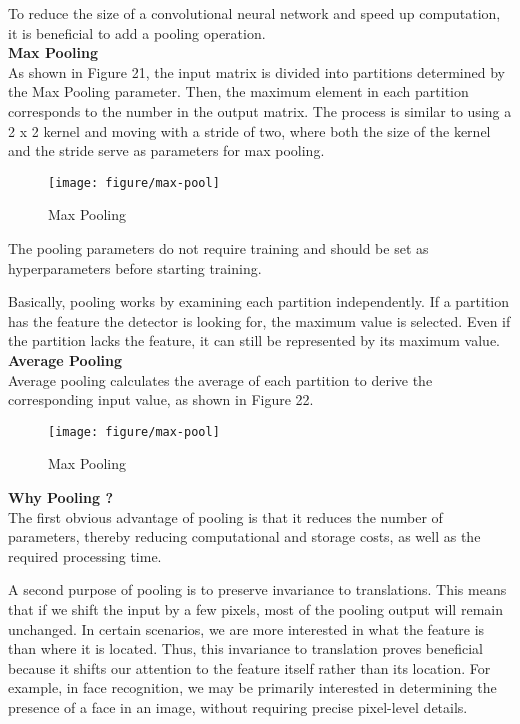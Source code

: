 \documentclass{article}
\begin{document}
To reduce the size of a convolutional neural network and speed up computation, it is beneficial to add a pooling operation.\\

\noindent
\textbf{Max Pooling}\\
\noindent
As shown in Figure 21, the input matrix is divided into partitions determined by the Max Pooling parameter. Then, the maximum element in each partition corresponds to the number in the output matrix. The process is similar to using a 2 x 2 kernel and moving with a stride of two, where both the size of the kernel and the stride serve as parameters for max pooling.


\begin{figure}[htbp]
        \centering
        \texttt{[image: figure/max-pool]}
        \caption{Max Pooling}
     \end{figure}
     
The pooling parameters do not require training and should be set as hyperparameters before starting training.

Basically, pooling works by examining each partition independently. If a partition has the feature the detector is looking for, the maximum value is selected. Even if the partition lacks the feature, it can still be represented by its maximum value.\\


\noindent
\textbf{Average Pooling}\\
\noindent
Average pooling calculates the average of each partition to derive the corresponding input value, as shown in Figure 22.


\begin{figure}[htbp]
        \centering
        \texttt{[image: figure/max-pool]}
        \caption{Max Pooling}
     \end{figure}


\noindent
\textbf{Why Pooling ? }\\
\noindent
The first obvious advantage of pooling is that it reduces the number of parameters, thereby reducing computational and storage costs, as well as the required processing time.

A second purpose of pooling is to preserve invariance to translations. This means that if we shift the input by a few pixels, most of the pooling output will remain unchanged. In certain scenarios, we are more interested in what the feature is than where it is located. Thus, this invariance to translation proves beneficial because it shifts our attention to the feature itself rather than its location. For example, in face recognition, we may be primarily interested in determining the presence of a face in an image, without requiring precise pixel-level details.
\end{document}
